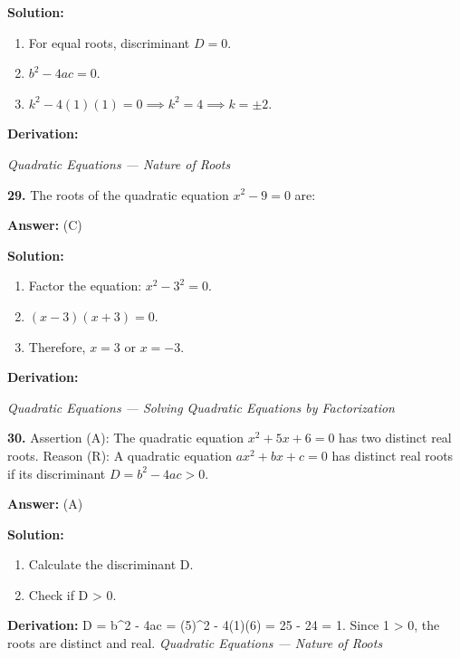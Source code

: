 \documentclass[12pt,a4paper]{exam}
\newcommand{\fitmath}[1]{%
  \sbox{\schmathbox}{$\displaystyle #1$}%
  \ifdim\wd\schmathbox>\linewidth
    \resizebox{\linewidth}{!}{\usebox{\schmathbox}}%
  \else
    \usebox{\schmathbox}%
  \fi}
\begin{document}
\begin{questions}
\textbf{Solution:}
\begin{enumerate}
  \item For equal roots, discriminant $D = 0$.
  \item $b^2 - 4ac = 0$.
  \item $k^2 - 4(1)(1) = 0 \implies k^2 = 4 \implies k = \pm 2$.
\end{enumerate}
\textbf{Derivation:}
\begin{center}
\fitmath{\begin{aligned}
D = k^2 - 4(1)(1) = 0 \\
\implies k^2 = 4 \\
\implies k = \pm 2
\end{aligned}}
\end{center}
\hfill \textit{Quadratic Equations — Nature of Roots}
\vspace{0.3cm}

\question \textbf{29.} The roots of the quadratic equation $x^2 - 9 = 0$ are:

\textbf{Answer:}
(C)

\textbf{Solution:}
\begin{enumerate}
  \item Factor the equation: $x^2 - 3^2 = 0$.
  \item $(x - 3)(x + 3) = 0$.
  \item Therefore, $x = 3$ or $x = -3$.
\end{enumerate}
\textbf{Derivation:}
\begin{center}
\fitmath{\begin{aligned}
x^2 = 9 \\
\implies x = \pm \sqrt{9} \\
\implies x = \pm 3
\end{aligned}}
\end{center}
\hfill \textit{Quadratic Equations — Solving Quadratic Equations by Factorization}
\vspace{0.3cm}

\question \textbf{30.} Assertion (A): The quadratic equation $x^2 + 5x + 6 = 0$ has two distinct real roots. Reason (R): A quadratic equation $ax^2 + bx + c = 0$ has distinct real roots if its discriminant $D = b^2 - 4ac > 0$.

\textbf{Answer:}
(A)

\textbf{Solution:}
\begin{enumerate}
  \item Calculate the discriminant D.
  \item Check if D > 0.
\end{enumerate}
\textbf{Derivation:}
D = b\textasciicircum{}2 - 4ac = (5)\textasciicircum{}2 - 4(1)(6) = 25 - 24 = 1. Since 1 > 0, the roots are distinct and real.
\hfill \textit{Quadratic Equations — Nature of Roots}
\vspace{0.3cm}


\end{questions}
\end{document}
